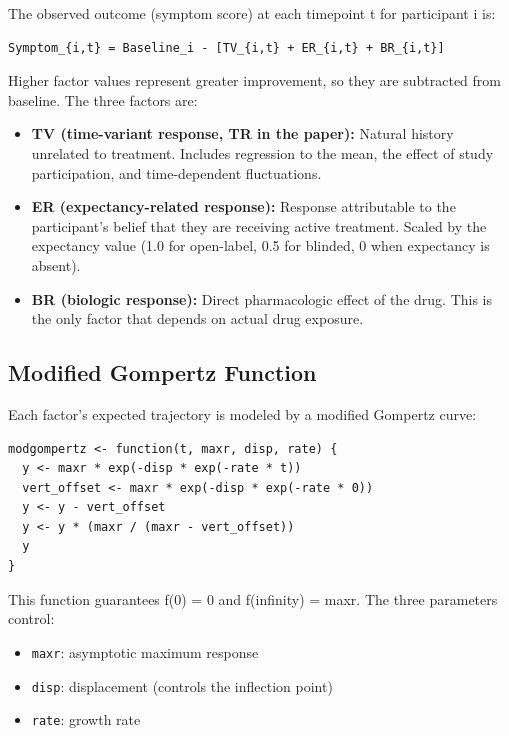 \documentclass[11pt]{article}
\begin{document}
The observed outcome (symptom score) at each timepoint t for
participant i is:

\begin{verbatim}
Symptom_{i,t} = Baseline_i - [TV_{i,t} + ER_{i,t} + BR_{i,t}]
\end{verbatim}

Higher factor values represent greater improvement, so they are
subtracted from baseline. The three factors are:

\begin{itemize}
  \item \textbf{TV (time-variant response, TR in the paper):} Natural history
    unrelated to treatment. Includes regression to the mean, the
    effect of study participation, and time-dependent fluctuations.
  \item \textbf{ER (expectancy-related response):} Response attributable to
    the participant's belief that they are receiving active
    treatment. Scaled by the expectancy value (1.0 for open-label,
    0.5 for blinded, 0 when expectancy is absent).
  \item \textbf{BR (biologic response):} Direct pharmacologic effect of the
    drug. This is the only factor that depends on actual drug
    exposure.
\end{itemize}

\subsection{Modified Gompertz Function}

Each factor's expected trajectory is modeled by a modified
Gompertz curve:

\begin{lstlisting}
modgompertz <- function(t, maxr, disp, rate) {
  y <- maxr * exp(-disp * exp(-rate * t))
  vert_offset <- maxr * exp(-disp * exp(-rate * 0))
  y <- y - vert_offset
  y <- y * (maxr / (maxr - vert_offset))
  y
}
\end{lstlisting}

This function guarantees f(0) = 0 and f(infinity) = maxr. The
three parameters control:

\begin{itemize}
  \item \texttt{maxr}: asymptotic maximum response
  \item \texttt{disp}: displacement (controls the inflection point)
  \item \texttt{rate}: growth rate
\end{itemize}
\end{document}
